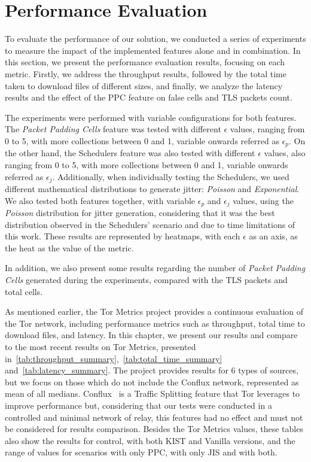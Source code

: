 \section{Performance Evaluation}\label{sec:performance_evaluation}

To evaluate the performance of our solution, we conducted a series of experiments to measure the impact of the implemented features alone and in combination. In this section, we present the performance evaluation results, focusing on each metric. Firstly, we address the throughput results, followed by the total time taken to download files of different sizes, and finally, we analyze the latency results and the effect of the PPC feature on false cells and TLS packets count. 

The experiments were performed with variable configurations for both features. The \textit{Packet Padding Cells} feature was tested with different $\epsilon$ values, ranging from 0 to 5, with more collections between 0 and 1, variable onwards referred as $\epsilon_p$. On the other hand, the Schedulers feature was also tested with different $\epsilon$ values, also ranging from 0 to 5, with more collections between 0 and 1, variable onwards referred as $\epsilon_j$. Additionally, when individually testing the Schedulers, we used different mathematical distributions to generate jitter: \textit{Poisson} and \textit{Exponential}. We also tested both features together, with variable $\epsilon_p$ and $\epsilon_j$ values, using the \textit{Poisson} distribution for jitter generation, considering that it was the best distribution observed in the Schedulers' scenario and due to time limitations of this work. These results are represented by heatmaps, with each $\epsilon$ as an axis, as the heat as the value of the metric.

In addition, we also present some results regarding the number of \textit{Packet Padding Cells} generated during the experiments, compared with the TLS packets and total cells.

As mentioned earlier, the Tor Metrics project provides a continuous evaluation of the Tor network, including performance metrics such as throughput, total time to download files, and latency. In this chapter, we present our results and compare to the most recent results on Tor Metrics, presented in~\autoref{tab:throughput_summary},~\autoref{tab:total_time_summary} and~\autoref{tab:latency_summary}. The project provides results for 6 types of sources, but we focus on those which do not include the Conflux network, represented as mean of all medians. Conflux~\Cite{CONFLUX} is a Traffic Splitting feature that Tor leverages to improve performance but, considering that our tests were conducted in a controlled and minimal network of relay, this features had no effect and must not be considered for results comparison. Besides the Tor Metrics values, these tables also show the results for control, with both KIST and Vanilla versions, and the range of values for scenarios with only PPC, with only JIS and with both.

